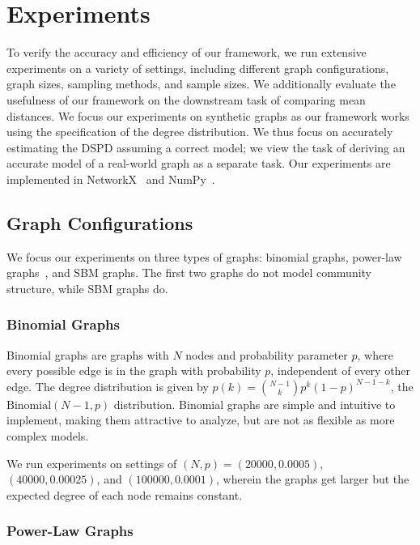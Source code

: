 \section{Experiments}
\label{sec:exp}

To verify the accuracy and efficiency of our framework, we run extensive experiments on a variety of settings, including different graph configurations, graph sizes, sampling methods, and sample sizes. We additionally evaluate the usefulness of our framework on the downstream task of comparing mean distances. We focus our experiments on synthetic graphs as our framework works using the specification of the degree distribution. We thus focus on accurately estimating the DSPD assuming a correct model; we view the task of deriving an accurate model of a real-world graph as a separate task. Our experiments are implemented in NetworkX~\cite{SciPyProceedings_11} and NumPy~\cite{harris2020array}.

\subsection{Graph Configurations}

We focus our experiments on three types of graphs: binomial graphs, power-law graphs~\cite{barabasi1999emergence}, and SBM graphs. The first two graphs do not model community structure, while SBM graphs do.

\subsubsection{Binomial Graphs}

Binomial graphs are graphs with $N$ nodes and probability parameter $p$, where every possible edge is in the graph with probability $p$, independent of every other edge. The degree distribution is given by $p(k) = \binom{N-1}{k}p^k(1-p)^{N-1-k}$, the $\text{Binomial}(N-1,p)$ distribution. Binomial graphs are simple and intuitive to implement, making them attractive to analyze, but are not as flexible as more complex models.

We run experiments on settings of $(N,p) = (20000, 0.0005)$, $(40000, 0.00025)$, and $(100000, 0.0001)$, wherein the graphs get larger but the expected degree of each node remains constant.

\subsubsection{Power-Law Graphs}

